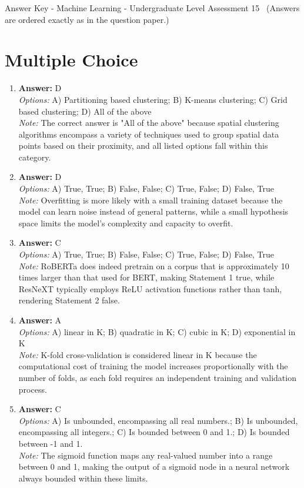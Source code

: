 \documentclass[12pt]{article}
\begin{document}
\begin{center}
Answer Key - Machine Learning - Undergraduate Level Assessment 15 \
\small (Answers are ordered exactly as in the question paper.)
\end{center}

\section*{Multiple Choice}
\begin{enumerate}[label=\arabic*.]
\item \textbf{Answer:} D
\\ \textit{Options:} A) Partitioning based clustering; B) K-means clustering; C) Grid based clustering; D) All of the above
\\ \textit{Note:} The correct answer is "All of the above" because spatial clustering algorithms encompass a variety of techniques used to group spatial data points based on their proximity, and all listed options fall within this category.
\item \textbf{Answer:} D
\\ \textit{Options:} A) True, True; B) False, False; C) True, False; D) False, True
\\ \textit{Note:} Overfitting is more likely with a small training dataset because the model can learn noise instead of general patterns, while a small hypothesis space limits the model's complexity and capacity to overfit.
\item \textbf{Answer:} C
\\ \textit{Options:} A) True, True; B) False, False; C) True, False; D) False, True
\\ \textit{Note:} RoBERTa does indeed pretrain on a corpus that is approximately 10 times larger than that used for BERT, making Statement 1 true, while ResNeXT typically employs ReLU activation functions rather than tanh, rendering Statement 2 false.
\item \textbf{Answer:} A
\\ \textit{Options:} A) linear in K; B) quadratic in K; C) cubic in K; D) exponential in K
\\ \textit{Note:} K-fold cross-validation is considered linear in K because the computational cost of training the model increases proportionally with the number of folds, as each fold requires an independent training and validation process.
\item \textbf{Answer:} C
\\ \textit{Options:} A) Is unbounded, encompassing all real numbers.; B) Is unbounded, encompassing all integers.; C) Is bounded between 0 and 1.; D) Is bounded between -1 and 1.
\\ \textit{Note:} The sigmoid function maps any real-valued number into a range between 0 and 1, making the output of a sigmoid node in a neural network always bounded within these limits.
\end{enumerate}
\end{document}
